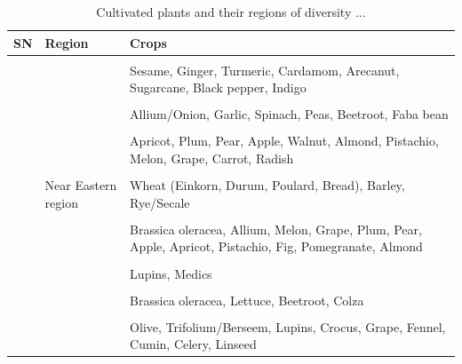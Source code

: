 \documentclass[11pt,ignorenonframetext,aspectratio=169]{beamer}
\begin{document}
\begin{frame}{}
\protect\hypertarget{section-10}{}
\begin{table}

\caption{\label{tab:cultivated-megacentres-tab2}Cultivated plants and their regions of diversity ...}
\centering
\fontsize{8}{10}\selectfont
\begin{tabular}[t]{>{\raggedright\arraybackslash}p{2em}>{\raggedright\arraybackslash}p{12em}>{\raggedright\arraybackslash}p{40em}}
\toprule
SN & Region & Crops\\
\midrule
\cellcolor{gray!6}{} & \cellcolor{gray!6}{} & \cellcolor{gray!6}{Citrus, Banana, Mango, Sunhemp, Tree cotton}\\
 &  & Sesame, Ginger, Turmeric, Cardamom, Arecanut, Sugarcane, Black pepper, Indigo\\
\cellcolor{gray!6}{5} & \cellcolor{gray!6}{Central Asian region} & \cellcolor{gray!6}{Wheat (Bread/Club/Shot), Rye}\\
 &  & Allium/Onion, Garlic, Spinach, Peas, Beetroot, Faba bean\\
\cellcolor{gray!6}{} & \cellcolor{gray!6}{} & \cellcolor{gray!6}{Lentil, Chickpea}\\
\addlinespace
 &  & Apricot, Plum, Pear, Apple, Walnut, Almond, Pistachio, Melon, Grape, Carrot, Radish\\
\cellcolor{gray!6}{} & \cellcolor{gray!6}{} & \cellcolor{gray!6}{Hemp/Cannabis, Sesame, Flax, Safflower}\\
6 & Near Eastern region & Wheat (Einkorn, Durum, Poulard, Bread), Barley, Rye/Secale\\
\cellcolor{gray!6}{} & \cellcolor{gray!6}{} & \cellcolor{gray!6}{Faba bean, Chickpea, French bean, Lentil, Pea}\\
 &  & Brassica oleracea, Allium, Melon, Grape, Plum, Pear, Apple, Apricot, Pistachio, Fig, Pomegranate, Almond\\
\addlinespace
\cellcolor{gray!6}{} & \cellcolor{gray!6}{} & \cellcolor{gray!6}{Safflower, Sesame, Flax}\\
 &  & Lupins, Medics\\
\cellcolor{gray!6}{7} & \cellcolor{gray!6}{Mediterranean region} & \cellcolor{gray!6}{Wheat (Durum, Turgidum), Oats}\\
 &  & Brassica oleracea, Lettuce, Beetroot, Colza\\
\cellcolor{gray!6}{} & \cellcolor{gray!6}{} & \cellcolor{gray!6}{Faba bean, Radish}\\
\addlinespace
 &  & Olive, Trifolium/Berseem, Lupins, Crocus, Grape, Fennel, Cumin, Celery, Linseed\\
\bottomrule
\end{tabular}
\end{table}
\end{frame}
\end{document}

